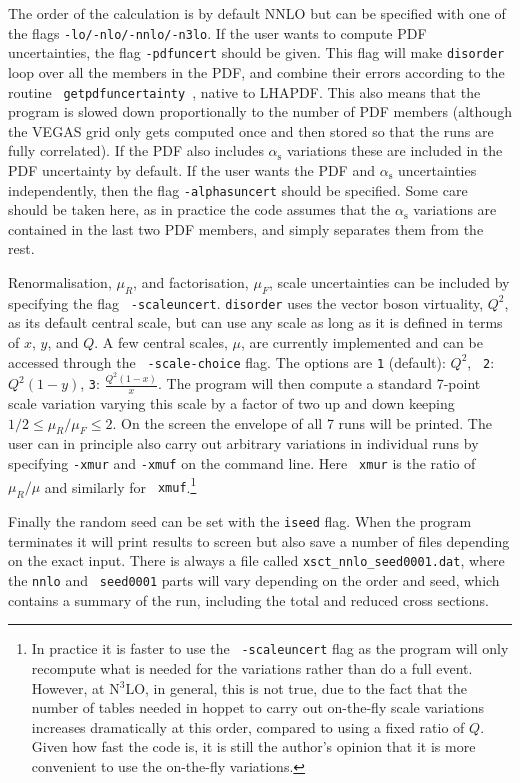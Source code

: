 \documentclass[submission, PhysCodeb]{SciPost_better_arXiv}
\newcommand{\hoppet}{{\sc hoppet}}
\newcommand{\disorder}{{\tt disorder}}
\newcommand{\as}{\alpha_{\mathrm{s}}}
\newcommand{\NNNLO}{N$^3$LO}
\begin{document}
The order of the calculation is by default NNLO but can be specified
with one of the flags {\tt -lo/-nlo/-nnlo/-n3lo}. If the user wants to
compute PDF uncertainties, the flag {\tt -pdfuncert} should be
given. This flag will make \disorder{} loop over all the members in
the PDF, and combine their errors according to the routine {\tt
  getpdfuncertainty}~\cite{Watt:2011kp}, native to LHAPDF. This also
means that the program is slowed down proportionally to the number of
PDF members (although the VEGAS grid only gets computed once and then
stored so that the runs are fully correlated). If the PDF also
includes $\as$ variations these are included in the PDF uncertainty by
default. If the user wants the PDF and $\as$ uncertainties
independently, then the flag {\tt -alphasuncert} should be
specified. Some care should be taken here, as in practice the code
assumes that the $\as$ variations are contained in the last two PDF
members, and simply separates them from the rest.

Renormalisation, $\mu_R$, and factorisation, $\mu_F$, scale
uncertainties can be included by specifying the flag {\tt
  -scaleuncert}. \disorder{} uses the vector boson virtuality, $Q^2$,
as its default central scale, but can use any scale as long as it is
defined in terms of $x$, $y$, and $Q$. A few central scales, $\mu$,
are currently implemented and can be accessed through the {\tt
  -scale-choice} flag. The options are {\tt 1} (default): $Q^2$, {\tt
  2}: $Q^2(1-y)$, {\tt 3}: $\frac{Q^2(1-x)}{x}$. The program will then
compute a standard 7-point scale variation varying this scale by a
factor of two up and down keeping $1/2\le \mu_R/\mu_F\le 2$. On the
screen the envelope of all 7 runs will be printed. The user can in
principle also carry out arbitrary variations in individual runs by
specifying {\tt -xmur} and {\tt -xmuf} on the command line. Here {\tt
  xmur} is the ratio of $\mu_R/\mu$ and similarly for {\tt
  xmuf}.\footnote{In practice it is faster to use the {\tt
  -scaleuncert} flag as the program will only recompute what is needed
for the variations rather than do a full event. However, at \NNNLO{},
in general, this is not true, due to the fact that the number of
tables needed in \hoppet{} to carry out on-the-fly scale variations
increases dramatically at this order, compared to using a fixed ratio
of $Q$. Given how fast the code is, it is still the author's opinion
that it is more convenient to use the on-the-fly variations.}

Finally the random seed can be set with the {\tt iseed} flag. When the
program terminates it will print results to screen but also save a
number of files depending on the exact input. There is always a file
called {\tt xsct\_nnlo\_seed0001.dat}, where the {\tt nnlo} and {\tt
  seed0001} parts will vary depending on the order and seed, which
contains a summary of the run, including the total and reduced cross
sections. 
\end{document}
